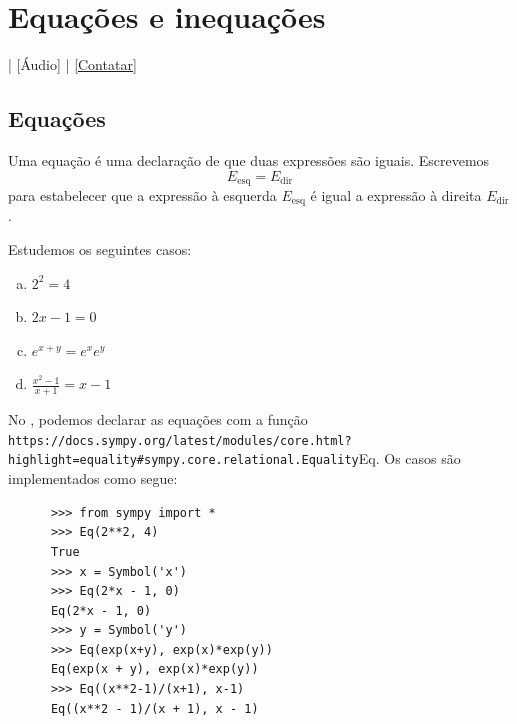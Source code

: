 
\chapter{Equações e inequações}\label{cap_ineq}
\thispagestyle{fancy}

\begin{flushright}
  [Vídeo] | [Áudio] | \href{https://phkonzen.github.io/notas/contato.html}{[Contatar]}
\end{flushright}

\section{Equações}\label{cap_ineq_sec_eq}

Uma equação é uma declaração de que duas expressões são iguais. Escrevemos
\begin{equation}
  E_{\text{esq}} = E_{\text{dir}}
\end{equation}
para estabelecer que a expressão à esquerda $E_{\text{esq}}$ é igual a expressão à direita $E_{\text{dir}}$.

\begin{ex}
  Estudemos os seguintes casos:
  \begin{enumerate}[a)]
  \item $2^2 = 4$
  \item $2x - 1 = 0$
  \item $e^{x+y} = e^xe^y$
  \item $\displaystyle \frac{x^2-1}{x+1} = x - 1$
  \end{enumerate}

  \begin{ifispython}
    No \python, podemos declarar as equações com a função \lstinline{https://docs.sympy.org/latest/modules/core.html?highlight=equality#sympy.core.relational.Equality}{Eq}. Os casos são implementados como segue:
    \begin{lstlisting}
      >>> from sympy import *
      >>> Eq(2**2, 4)
      True
      >>> x = Symbol('x')
      >>> Eq(2*x - 1, 0)
      Eq(2*x - 1, 0)
      >>> y = Symbol('y')
      >>> Eq(exp(x+y), exp(x)*exp(y))
      Eq(exp(x + y), exp(x)*exp(y))
      >>> Eq((x**2-1)/(x+1), x-1)
      Eq((x**2 - 1)/(x + 1), x - 1)
    \end{lstlisting}
  \end{ifispython}
\end{ex}

